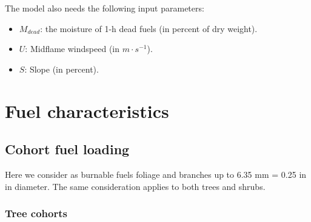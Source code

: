 \documentclass[]{book}
\providecommand{\tightlist}{%
  \setlength{\itemsep}{0pt}\setlength{\parskip}{0pt}}
\begin{document}
The model also needs the following input parameters:

\begin{itemize}
\tightlist
\item
  \(M_{dead}\): the moisture of 1-h dead fuels (in percent of dry weight).
\item
  \(U\): Midflame windspeed (in \(m\cdot s^{-1}\)).
\item
  \(S\): Slope (in percent).
\end{itemize}

\hypertarget{fuel-characteristics}{%
\section{Fuel characteristics}\label{fuel-characteristics}}

\hypertarget{cohort-fuel-loading}{%
\subsection{Cohort fuel loading}\label{cohort-fuel-loading}}

Here we consider as burnable fuels foliage and branches up to 6.35 mm = 0.25 in in diameter. The same consideration applies to both trees and shrubs.

\hypertarget{tree-cohorts}{%
\subsubsection{Tree cohorts}\label{tree-cohorts}}
\end{document}
